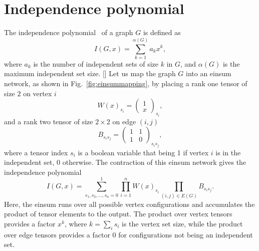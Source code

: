\documentclass{article}
\newcommand{\<}{\langle}
\renewcommand{\>}{\rangle}
\renewcommand{\cite}[1]{{\citep{#1}}}
\newcommand{\Fig}[1]{Fig.~\ref{#1}}
\newcommand{\blue}[1]{[{\bf  \color{blue}{JG: #1}}]}
\theoremstyle{definition}\newtheorem{definition}{\textit{Definition}}
\begin{document}
\section{Independence polynomial}
The independence polynomial~\cite{Ferrin2014, Harvey2017} of a graph $G$ is defined as
\begin{equation}
I(G, x) = \sum_{k=1}^{\alpha(G)} a_k x^k,
\end{equation}
where $a_k$ is the number of independent sets of size $k$ in $G$, and $\alpha(G)$ is the maximum independent set size.
\blue{here, I preassumed a user knows tensor network, add more details later.}
Let us map the graph $G$ into an einsum network, as shown in \Fig{fig:einsummapping}, by placing a rank one tensor of size $2$ on vertex $i$
\begin{equation}
    W(x)_{s_i} = \left(\begin{matrix}
        1 \\
        x
    \end{matrix}\right)_{s_i},
\end{equation}
and a rank two tensor of size $2 \times 2$ on edge $(i,j)$
\begin{equation}
    B_{s_i s_j} = \left(\begin{matrix}
        1  & 1\\
        1 & 0
    \end{matrix}\right)_{s_is_j},
\end{equation}
where a tensor index $s_i$ is a boolean variable that being 1 if vertex $i$ is in the independent set, 0 otherwise. The contraction of this einsum network gives the independence polynomial %
\begin{equation}
    I(G, x) = \sum\limits_{s_1, s_2, \ldots, s_n = 0}^{1} \prod\limits_{i=1}^n W(x)_{s_i} \prod\limits_{(i,j) \in E(G)} B_{s_i s_j}.
\end{equation}
Here, the einsum runs over all possible vertex configurations and accumulates the product of tensor elements to the output.
The product over vertex tensors provides a factor $x^k$, where $k=\sum_i s_i$ is the vertex set size, 
while the product over edge tensors provides a factor $0$ for configurations not being an independent set.
\end{document}
